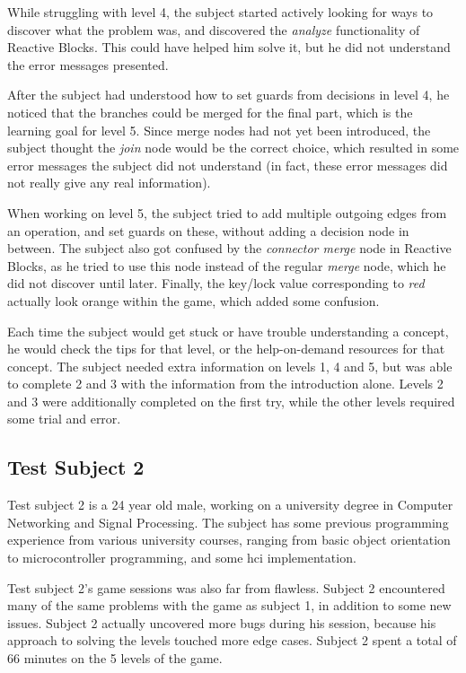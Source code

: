 \noindent
While struggling with level 4, the subject started actively looking for ways to discover what the problem was, and discovered the \emph{analyze} functionality of Reactive Blocks. This could have helped him solve it, but he did not understand the error messages presented.

\noindent
After the subject had understood how to set guards from decisions in level 4, he noticed that the branches could be merged for the final part, which is the learning goal for level 5. Since merge nodes had not yet been introduced, the subject thought the \emph{join} node would be the correct choice, which resulted in some error messages the subject did not understand (in fact, these error messages did not really give any real information).

\noindent
When working on level 5, the subject tried to add multiple outgoing edges from an operation, and set guards on these, without adding a decision node in between. The subject also got confused by the \emph{connector merge} node in Reactive Blocks, as he tried to use this node instead of the regular \emph{merge} node, which he did not discover until later. Finally, the key/lock value corresponding to \emph{red} actually look orange within the game, which added some confusion.

\noindent
Each time the subject would get stuck or have trouble understanding a concept, he would check the tips for that level, or the help-on-demand resources for that concept. The subject needed extra information on levels 1, 4 and 5, but was able to complete 2 and 3 with the information from the introduction alone. Levels 2 and 3 were additionally completed on the first try, while the other levels required some trial and error.

\subsection{Test Subject 2}
\label{sec:game_testing_subject2}
Test subject 2 is a 24 year old male, working on a university degree in Computer Networking and Signal Processing. The subject has some previous programming experience from various university courses, ranging from basic object orientation to microcontroller programming, and some \gls{hci} implementation.

\noindent
Test subject 2's game sessions was also far from flawless. Subject 2 encountered many of the same problems with the game as subject 1, in addition to some new issues. Subject 2 actually uncovered more bugs during his session, because his approach to solving the levels touched more edge cases. Subject 2 spent a total of 66 minutes on the 5 levels of the game.

